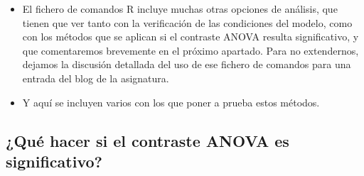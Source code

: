 \begin{itemize}
    \item El fichero de comandos R incluye muchas otras opciones de análisis, que tienen que ver tanto con la verificación de las condiciones del modelo, como con los métodos que se aplican si el contraste ANOVA resulta significativo, y que comentaremos brevemente en el próximo apartado. Para no extendernos, dejamos la discusión detallada del uso de ese fichero de comandos para una entrada del blog de la asignatura.

    \item Y aquí se incluyen varios   con los que poner a prueba estos métodos.
    \end{itemize}


\subsection{¿Qué hacer si el contraste ANOVA es significativo?}
